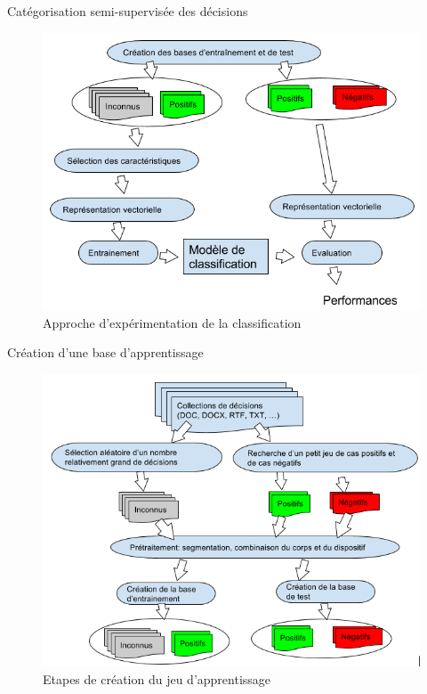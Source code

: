 \documentclass[newPxFont,pagenumber]{beamer}
\begin{document}
\begin{frame}{Catégorisation semi-supervisée des décisions}
\begin{figure}
\includegraphics[scale=0.6]{archi-classif.png}
\caption{Approche d'expérimentation de la classification}
\end{figure}
\end{frame}

\begin{frame}{Création d'une base d'apprentissage}
\begin{figure}
\includegraphics[scale=0.6]{createDataset-classif.png}
\caption{Etapes de création du jeu d'apprentissage}
\end{figure}
\end{frame}
\end{document}
